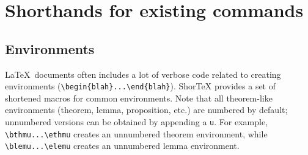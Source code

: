 \documentclass{article}
\begin{document}
\section{Shorthands for existing commands}

\subsection{Environments}

\LaTeX~documents often includes a lot of verbose code
related to creating environments (\verb!\begin{blah}...\end{blah}!). ShorTeX provides a set of 
shortened macros for common environments.
Note that all theorem-like environments (theorem, lemma, proposition, etc.) 
are numbered by default; unnumbered versions can be obtained by appending a \verb!u!. For example,
\verb!\bthmu...\ethmu! creates an unnumbered theorem environment, while
\verb!\blemu...\elemu! creates an unnumbered lemma environment.
\end{document}
